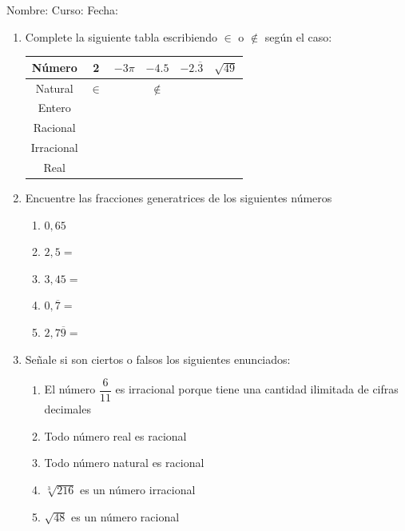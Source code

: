 \documentclass[fleqn]{article}
\newcommand{\LineaNombre}{%
\par
\vspace{\baselineskip}
Nombre:\hrulefill \; Curso: \underline{\hspace*{36pt}} \; Fecha: \underline{\hspace*{2.5cm}} \relax
\par}
\begin{document}
\LineaNombre
\begin{enumerate}
   \item Complete la siguiente tabla escribiendo $\in$ o $\not\in$ según el caso:
\begin{center}
   \begin{tabular}{|c|c|c|c|c|c|}
\hline 
Número & 2 & $-3\pi$ & $-4.5$ & $-2.\overline{3}$ & $\sqrt{49}$ \\ 
\hline 
Natural & $\in$ &  & $\not\in$ &  &  \\ 
\hline 
Entero &  &  &  &  &  \\ 
\hline 
Racional &  &  &  &  &  \\ 
\hline 
Irracional &  &  &  &  &  \\ 
\hline 
Real &  &  &  &  &  \\ 
\hline 
\end{tabular} 
\end{center}
 \item Encuentre las fracciones generatrices de los siguientes números
\begin{enumerate}
\item $0,65$\noanswer
\item $2,5=$\noanswer
\item $3,45=$\noanswer
\item $0,\overline{7}=$\noanswer
\item $2,7\overline{9}=$\noanswer
\end{enumerate}
\newpage
\item Señale si son ciertos o falsos los siguientes enunciados:
\begin{enumerate}
\item El número $\dfrac{6}{11}$ es irracional porque tiene una cantidad ilimitada de cifras decimales \underline{\hspace*{12pt}}
\item Todo número real es racional 
\item Todo número natural es racional 
\item $\sqrt[3]{216}$ es un número irracional 
\item $\sqrt{48}$ es un número racional 
\end{enumerate}
\end{enumerate}
\end{document}
